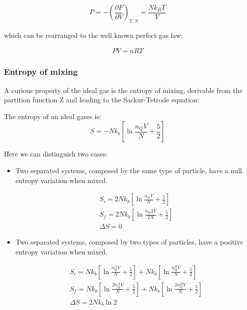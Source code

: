 \documentclass{article}
\begin{document}
\begin{equation}
    P=-\left(\frac{\partial F}{\partial V}\right)_{T,N}=\frac{Nk_BT}{V}
\end{equation}

which can be rearranged to the well known perfect gas law:

\begin{align*}
    PV=nRT
\end{align*}


\subsubsection{Entropy of mixing}

A curious property of the ideal gas is the entropy of mixing, derivable from the partition function Z and
leading to the Sackur-Tetrode equation:

\begin{tcolorbox}[colframe=gray!50, colback=gray!10, coltitle=black, title=Sackur-Tetrode Equation]
    The entropy of an ideal gases is:
    \begin{equation}
        S=-Nk_b\left[\ln{\frac{n_QV}{N}}+\frac{5}{2}\right]
    \end{equation}

\end{tcolorbox}

Here we can distinguish two cases:

\begin{itemize}
    \item Two separated systems, composed by the same type of particle, have a null entropy variation when mixed.


          \begin{align*}
               & S_i=2Nk_b\left[\ln{\frac{n_QV}{N}}+\frac{5}{2}\right]   \\
               & S_f=2Nk_b\left[\ln{\frac{n_Q2V}{2N}}+\frac{5}{2}\right] \\
               & \Delta S=0
          \end{align*}


    \item Two separated systems, composed by two types of particles, have a positive entropy variation when mixed.


          \begin{align*}
               & S_i=Nk_b\left[\ln{\frac{n_Q^AV}{N}}+\frac{5}{2}\right]+Nk_b\left[\ln{\frac{n_Q^BV}{N}}+\frac{5}{2}\right]    \\
               & S_f= Nk_b\left[\ln{\frac{2n_Q^AV}{N}}+\frac{5}{2}\right]+Nk_b\left[\ln{\frac{2n_Q^BV}{N}}+\frac{5}{2}\right] \\
               & \Delta S=2Nk_b\ln{2}
          \end{align*}

\end{itemize}
\end{document}
